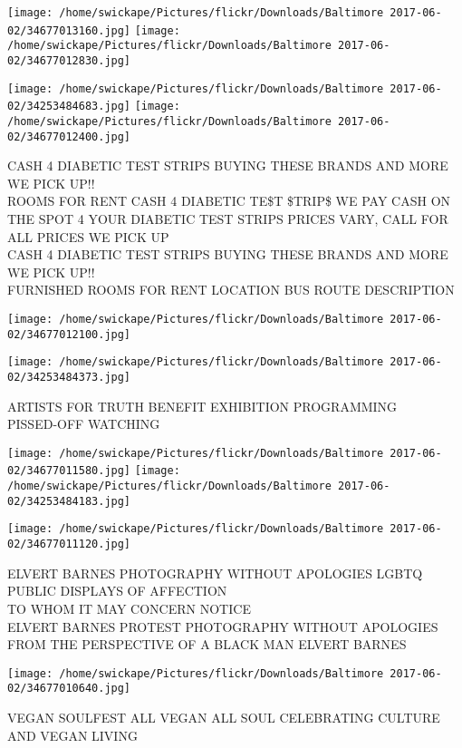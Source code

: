 \documentclass[10pt,letterpaper]{article}
\begin{document}
\texttt{[image: /home/swickape/Pictures/flickr/Downloads/Baltimore 2017-06-02/34677013160.jpg]}
\texttt{[image: /home/swickape/Pictures/flickr/Downloads/Baltimore 2017-06-02/34677012830.jpg]}

\texttt{[image: /home/swickape/Pictures/flickr/Downloads/Baltimore 2017-06-02/34253484683.jpg]}
\texttt{[image: /home/swickape/Pictures/flickr/Downloads/Baltimore 2017-06-02/34677012400.jpg]}

CASH 4 DIABETIC TEST STRIPS BUYING THESE BRANDS AND MORE WE PICK UP!!\\
ROOMS FOR RENT CASH 4 DIABETIC TE\$T \$TRIP\$ WE PAY CASH ON THE SPOT 4 YOUR DIABETIC TEST STRIPS PRICES VARY, CALL FOR ALL PRICES WE PICK UP\\
CASH 4 DIABETIC TEST STRIPS BUYING THESE BRANDS AND MORE WE PICK UP!!\\
FURNISHED ROOMS FOR RENT LOCATION BUS ROUTE DESCRIPTION
\pagebreak

\texttt{[image: /home/swickape/Pictures/flickr/Downloads/Baltimore 2017-06-02/34677012100.jpg]}

\vspace{0.25in}
\texttt{[image: /home/swickape/Pictures/flickr/Downloads/Baltimore 2017-06-02/34253484373.jpg]}

ARTISTS FOR TRUTH BENEFIT EXHIBITION PROGRAMMING\\
PISSED{-}OFF WATCHING
\pagebreak

\texttt{[image: /home/swickape/Pictures/flickr/Downloads/Baltimore 2017-06-02/34677011580.jpg]}
\texttt{[image: /home/swickape/Pictures/flickr/Downloads/Baltimore 2017-06-02/34253484183.jpg]}

\texttt{[image: /home/swickape/Pictures/flickr/Downloads/Baltimore 2017-06-02/34677011120.jpg]}

ELVERT BARNES PHOTOGRAPHY WITHOUT APOLOGIES LGBTQ PUBLIC DISPLAYS OF AFFECTION\\
TO WHOM IT MAY CONCERN NOTICE\\
ELVERT BARNES PROTEST PHOTOGRAPHY WITHOUT APOLOGIES FROM THE PERSPECTIVE OF A BLACK MAN ELVERT BARNES
\pagebreak

\texttt{[image: /home/swickape/Pictures/flickr/Downloads/Baltimore 2017-06-02/34677010640.jpg]}

VEGAN SOULFEST ALL VEGAN ALL SOUL CELEBRATING CULTURE AND VEGAN LIVING
\pagebreak
\end{document}
